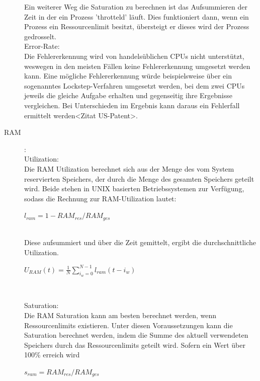 \documentclass[a4paper,10pt]{scrartcl}
\begin{document}
\begin{description}
Ein weiterer Weg die Saturation zu berechnen ist das Aufsummieren der Zeit in der ein Prozess 'throtteld' läuft. Dies funktioniert dann, wenn ein Prozess ein Ressourcenlimit besitzt, übersteigt er dieses wird der Prozess gedrosselt.\\
Error-Rate:\\
Die Fehlererkennung wird von handelsüblichen CPUs nicht unterstützt, weswegen in den meisten Fällen keine Fehlererkennung umgesetzt werden kann. Eine mögliche Fehlererkennung würde beispielsweise über ein sogenanntes Lockstep-Verfahren umgesetzt werden, bei dem zwei CPUs jeweils die gleiche Aufgabe erhalten und gegenseitig ihre Ergebnisse vergleichen. Bei Unterschieden im Ergebnis kann daraus ein Fehlerfall ermittelt werden<Zitat US-Patent>.
\item[RAM]:\\
Utilization:\\
Die RAM Utilization berechnet sich aus der Menge des vom System reservierten Speichers, der durch die Menge des gesamten Speichers geteilt wird. Beide stehen in UNIX basierten Betriebssystemen zur Verfügung, sodass die Rechnung zur RAM-Utilization lautet:\\


\begin{Huge}
\(
\displaystyle{l_{ram}=1-RAM_{res}/RAM_{ges}}
\) 
\end{Huge}\\

Diese aufsummiert und über die Zeit gemittelt, ergibt die durchschnittliche Utilization.\\

\begin{Huge}
\(
\displaystyle{U_{RAM}(t)=\frac{1}{N}{\sum\limits_{i_{w}=0}^{N-1} l_{ram}{(t-i_{w})}} }
\) 
\end{Huge}\\

\pagebreak

Saturation:\\
Die RAM Saturation kann am besten berechnet werden, wenn Ressourcenlimits existieren. Unter diesen Voraussetzungen kann die Saturation berechnet werden, indem die Summe des aktuell verwendeten Speichers durch das Ressourcenlimits geteilt wird. Sofern ein Wert über 100\% erreich wird\\

\begin{Huge}
\(
\displaystyle{s_{ram}=RAM_{res}/RAM_{ges}}
\) 
\end{Huge}\\


\end{description}
\end{document}
